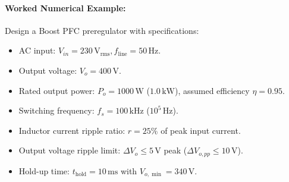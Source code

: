 \paragraph{Worked Numerical Example:}
Design a Boost PFC preregulator with specifications:
\begin{itemize}
  \item AC input: $V_{in} = 230\,\si{\volt}_{\mathrm{rms}}, f_{\mathrm{line}} = 50\,\si{\hertz}$.
  \item Output voltage: $V_o = 400\,\si{\volt}$.
  \item Rated output power: $P_o = 1000\,\si{\watt}$ ($1.0\,\si{\kilo\watt}$), assumed efficiency $\eta = 0.95$.
  \item Switching frequency: $f_s = 100\,\si{\kilo\hertz}$ ($10^5\,\si{\hertz}$).
  \item Inductor current ripple ratio: $r = 25\%$ of peak input current.
  \item Output voltage ripple limit: $\Delta V_o \le 5\,\si{\volt}$ peak ($\Delta V_{o,pp} \le 10\,\si{\volt}$).
  \item Hold-up time: $t_{\mathrm{hold}} = 10\,\si{\milli\second}$ with $V_{o,\min} = 340\,\si{\volt}$.
\end{itemize}

